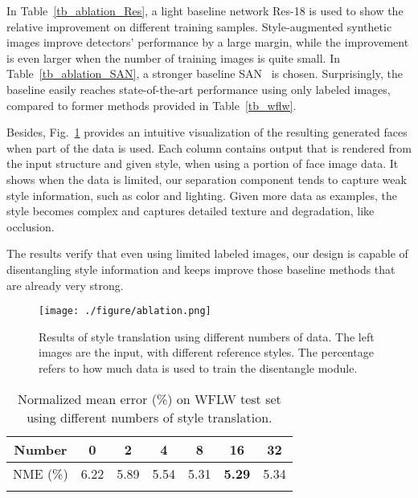 \documentclass[10pt,twocolumn,letterpaper]{article}
\begin{document}
In Table~\ref{tb_ablation_Res}, a light baseline network Res-18 is used to show the relative improvement on different training samples. Style-augmented synthetic images improve detectors' performance by a large margin, while the improvement is even larger when the number of training images is quite small. In Table~\ref{tb_ablation_SAN}, a stronger baseline SAN~\cite{SAN} is chosen. Surprisingly, the baseline easily reaches state-of-the-art performance using only  labeled images, compared to former methods provided in Table~\ref{tb_wflw}.



Besides, Fig.~\ref{ablation} provides an intuitive visualization of the resulting generated faces when part of the data is used. Each column contains output that is rendered from the input structure and given style, when using a portion of face image data. It shows when the data is limited, our separation component tends to capture weak style information, such as color and lighting. Given more data as examples, the style becomes complex and captures detailed texture and degradation, like occlusion. 

The results verify that even using limited labeled images, our design is capable of disentangling style information and keeps improve those baseline methods that are already very strong.

\begin{figure}[tb]
\begin{center}
\texttt{[image: ./figure/ablation.png]}
\end{center}
\vspace{-0.5cm}
\caption{\label{ablation}{Results of style translation using different numbers of data. The left  images are the input, with  different reference styles. The percentage refers to how much data is used to train the disentangle module.}}
\end{figure}

\begin{table}[tb]
\begin{center}
\begin{tabular}{c|c|c|c|c|c|c}
\Xhline{1.2pt}
Number  & 0    & 2    & 4    & 8    & 16   & 32   \\ \hline
NME (\%) & 6.22 & 5.89 & 5.54 & 5.31 & \textbf{5.29} & 5.34 \\ 
\Xhline{1.2pt}
\end{tabular}
\vspace{-0.3cm}
\end{center}
\caption{\label{stlye_num} {Normalized mean error (\%) on WFLW test set using different numbers of style translation.}}
\vspace{-0.3cm}
\end{table}
\end{document}
